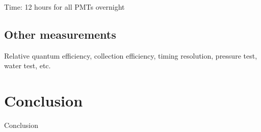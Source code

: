 \documentclass[12pt,a4paper]{article}
\begin{document}
Time: 12 hours for all PMTs overnight

\subsection{Other measurements}
Relative quantum efficiency, collection efficiency, timing resolution, pressure test, water test, etc.

\section{Conclusion}
Conclusion

\FloatBarrier

%
\end{document}
